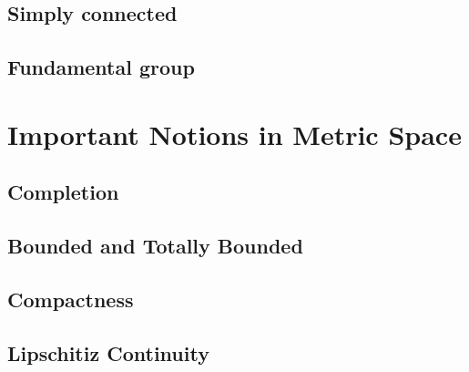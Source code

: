 \documentclass{report}
\begin{document}
\section{Simply connected}
\section{Fundamental group}
\chapter{Important Notions in Metric Space}
\section{Completion}
\section{Bounded and Totally Bounded}
\section{Compactness}
\section{Lipschitiz Continuity}
\end{document}
